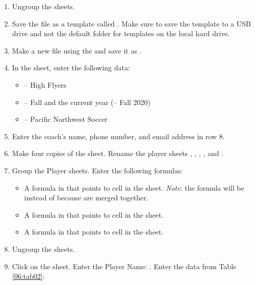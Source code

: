 \begin{enumerate}
	\item Ungroup the sheets.
	\item Save the file as a template called . Make sure to save the  template to a USB drive and not the default folder for templates on the local hard drive.
	\item Make a new file using the  and save it as .
	\item In the  sheet, enter the following data:
	
	\begin{itemize}
		\item {} – High Flyers
		\item {} – Fall and the current year (\ie – Fall 2020)
		\item {} – Pacific Northwest Soccer
	\end{itemize}
	
	\item Enter the coach's name, phone number, and email address in row 8.
	\item Make four copies of the  sheet. Rename the player sheets , , , , and .
	\item Group the Player sheets. Enter the following formulas:

	\begin{itemize}
		\item A formula in  that points to cell  in the  sheet. \textit{Note}: the formula will be  instead of  because  are merged together.
		\item A formula in  that points to cell  in the  sheet.
		\item A formula in  that points to cell  in the  sheet.
	\end{itemize}	

	\item Ungroup the sheets.
	\item Click on the  sheet. Enter the Player Name: . Enter the data from Table \ref{06:tab02}:
\end{enumerate}

